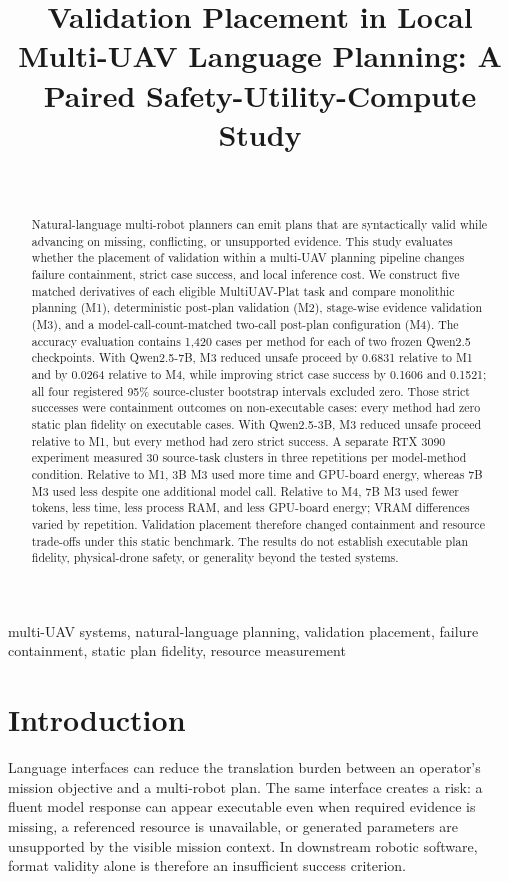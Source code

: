 \documentclass[conference]{IEEEtran}
\title{Validation Placement in Local Multi-UAV Language Planning: A Paired Safety-Utility-Compute Study}
\author{\IEEEauthorblockN{Author information withheld for mentor review}\\
\IEEEauthorblockA{Final manuscript prepared 12 August 2026}}
\begin{document}
\maketitle
\begin{abstract}
Natural-language multi-robot planners can emit plans that are syntactically valid while advancing on missing, conflicting, or unsupported evidence. This study evaluates whether the placement of validation within a multi-UAV planning pipeline changes failure containment, strict case success, and local inference cost. We construct five matched derivatives of each eligible MultiUAV-Plat task and compare monolithic planning (M1), deterministic post-plan validation (M2), stage-wise evidence validation (M3), and a model-call-count-matched two-call post-plan configuration (M4). The accuracy evaluation contains 1,420 cases per method for each of two frozen Qwen2.5 checkpoints. With Qwen2.5-7B, M3 reduced unsafe proceed by 0.6831 relative to M1 and by 0.0264 relative to M4, while improving strict case success by 0.1606 and 0.1521; all four registered 95\% source-cluster bootstrap intervals excluded zero. Those strict successes were containment outcomes on non-executable cases: every method had zero static plan fidelity on executable cases. With Qwen2.5-3B, M3 reduced unsafe proceed relative to M1, but every method had zero strict success. A separate RTX 3090 experiment measured 30 source-task clusters in three repetitions per model-method condition. Relative to M1, 3B M3 used more time and GPU-board energy, whereas 7B M3 used less despite one additional model call. Relative to M4, 7B M3 used fewer tokens, less time, less process RAM, and less GPU-board energy; VRAM differences varied by repetition. Validation placement therefore changed containment and resource trade-offs under this static benchmark. The results do not establish executable plan fidelity, physical-drone safety, or generality beyond the tested systems.
\end{abstract}
\begin{IEEEkeywords}
multi-UAV systems, natural-language planning, validation placement, failure containment, static plan fidelity, resource measurement
\end{IEEEkeywords}
\section{Introduction}

Language interfaces can reduce the translation burden between an operator's
mission objective and a multi-robot plan. The same interface creates a risk:
a fluent model response can appear executable even when required evidence is
missing, a referenced resource is unavailable, or generated parameters are
unsupported by the visible mission context. In downstream robotic software,
format validity alone is therefore an insufficient success criterion.
\end{document}
